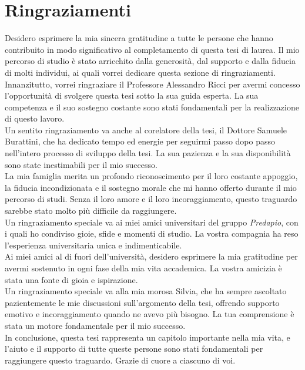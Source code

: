 \chapter*{Ringraziamenti}

Desidero esprimere la mia sincera gratitudine a tutte le persone che hanno contribuito in modo significativo al completamento di questa tesi di laurea. Il mio percorso di studio è 
stato arricchito dalla generosità, dal supporto e dalla fiducia di molti individui, ai quali vorrei dedicare questa sezione di ringraziamenti.\\
\newline
Innanzitutto, vorrei ringraziare il Professore Alessandro Ricci per avermi concesso l'opportunità di svolgere questa tesi sotto la sua guida esperta. La sua competenza e il suo 
sostegno costante sono stati fondamentali per la realizzazione di questo lavoro.\\
\newline
Un sentito ringraziamento va anche al corelatore della tesi, il Dottore Samuele Burattini, che ha dedicato tempo ed energie per seguirmi passo dopo passo nell'intero processo di
sviluppo della tesi. La sua pazienza e la sua disponibilità sono state inestimabili per il mio successo.\\
\newline
La mia famiglia merita un profondo riconoscimento per il loro costante appoggio, la fiducia incondizionata e il sostegno morale che mi hanno offerto durante il mio percorso di studi.
Senza il loro amore e il loro incoraggiamento, questo traguardo sarebbe stato molto più difficile da raggiungere.\\
\newline
Un ringraziamento speciale va ai miei amici universitari del gruppo \textit{Predapio}, con i quali ho condiviso gioie, sfide e momenti di studio. La vostra compagnia ha reso 
l'esperienza universitaria unica e indimenticabile.\\
\newline
Ai miei amici al di fuori dell'università, desidero esprimere la mia gratitudine per avermi sostenuto in ogni fase della mia vita accademica. La vostra amicizia è stata una fonte
di gioia e ispirazione.\\
\newline
Un ringraziamento speciale va alla mia morosa Silvia, che ha sempre ascoltato pazientemente le mie discussioni sull'argomento della tesi, offrendo supporto emotivo e incoraggiamento
quando ne avevo più bisogno. La tua comprensione è stata un motore fondamentale per il mio successo.\\
\newline
In conclusione, questa tesi rappresenta un capitolo importante nella mia vita, e l'aiuto e il supporto di tutte queste persone sono stati fondamentali per raggiungere questo traguardo. 
Grazie di cuore a ciascuno di voi.





